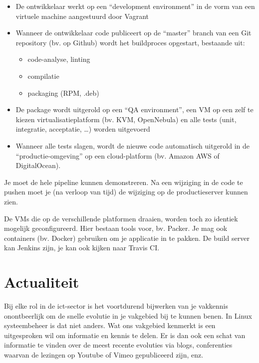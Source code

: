 \begin{itemize}
\item De ontwikkelaar werkt op een ``development environment'' in de vorm van een virtuele machine aangestuurd door Vagrant
\item Wanneer de ontwikkelaar code publiceert op de ``master'' branch van een Git repository (bv. op Github) wordt het buildproces opgestart, bestaande uit:

  \begin{itemize}
  \item code-analyse, linting
  \item compilatie
  \item packaging (RPM, .deb)
  \end{itemize}

\item De package wordt uitgerold op een ``QA environment'', een VM op een zelf te kiezen virtualisatieplatform (bv. KVM, OpenNebula) en alle tests (unit, integratie, acceptatie, \ldots{}) worden uitgevoerd
\item Wanneer alle tests slagen, wordt de nieuwe code automatisch uitgerold in de ``productie-omgeving'' op een cloud-platform (bv. Amazon AWS of DigitalOcean).
\end{itemize}

Je moet de hele pipeline kunnen demonstreren. Na een wijziging in de code te pushen moet je (na verloop van tijd) de wijziging op de productieserver kunnen zien.

De VMs die op de verschillende platformen draaien, worden toch zo identiek mogelijk geconfigureerd. Hier bestaan tools voor, bv. Packer.  Je mag ook containers (bv. Docker) gebruiken om je applicatie in te pakken. De build server kan Jenkins zijn, je kan ook kijken naar Travis CI.

\section{Actualiteit}
\label{sec:actualiteit}

Bij elke rol in de ict-sector is het voortdurend bijwerken van je vakkennis onontbeerlijk om de snelle evolutie in je vakgebied bij te kunnen benen. In Linux systeembeheer is dat niet anders. Wat ons vakgebied kenmerkt is een uitgesproken wil om informatie en kennis te delen. Er is dan ook een schat van informatie te vinden over de meest recente evoluties via blogs, conferenties waarvan de lezingen op Youtube of Vimeo gepubliceerd zijn, enz.

